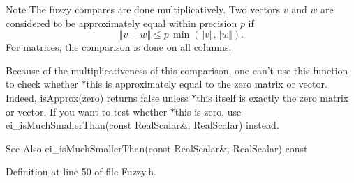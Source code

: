 \begin{DoxyNote}{Note}
The fuzzy compares are done multiplicatively. Two vectors $ v $ and $ w $ are considered to be approximately equal within precision $ p $ if \[ \Vert v - w \Vert \leqslant p\,\min(\Vert v\Vert, \Vert w\Vert). \] For matrices, the comparison is done on all columns.

Because of the multiplicativeness of this comparison, one can't use this function to check whether {\ttfamily $\ast$this} is approximately equal to the zero matrix or vector. Indeed, {\ttfamily is\-Approx(zero)} returns false unless {\ttfamily $\ast$this} itself is exactly the zero matrix or vector. If you want to test whether {\ttfamily $\ast$this} is zero, use ei\-\_\-is\-Much\-Smaller\-Than(const Real\-Scalar\&, Real\-Scalar) instead.
\end{DoxyNote}
\begin{DoxySeeAlso}{See Also}
ei\-\_\-is\-Much\-Smaller\-Than(const Real\-Scalar\&, Real\-Scalar) const 
\end{DoxySeeAlso}


Definition at line 50 of file Fuzzy.\-h.

